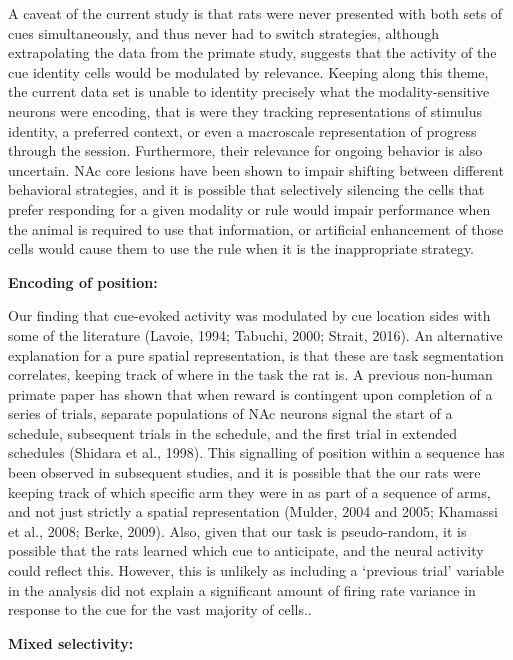 \documentclass[11pt]{article}
\begin{document}
{A caveat of the current study is that rats were never presented with both sets
of cues simultaneously, and thus never had to switch strategies, although
extrapolating the data from the primate study, suggests that the activity of the
cue identity cells would be modulated by relevance. Keeping along this theme,
the current data set is unable to identity precisely what the modality-sensitive
neurons were encoding, that is were they tracking representations of stimulus
identity, a preferred context, or even a macroscale representation of progress
through the session. Furthermore, their relevance for ongoing behavior is also
uncertain. NAc core lesions have been shown to impair shifting between different
behavioral strategies, and it is possible that selectively silencing the cells
that prefer responding for a given modality or rule would impair performance
when the animal is required to use that information, or artificial enhancement
of those cells would cause them to use the rule when it is the inappropriate
strategy.

{\bf Encoding of position:}

Our finding that cue-evoked activity was modulated by cue location sides with
some of the literature (Lavoie, 1994; Tabuchi, 2000; Strait, 2016). An
alternative explanation for a pure spatial representation, is that these are
task segmentation correlates, keeping track of where in the task the rat is. A
previous non-human primate paper has shown that when reward is contingent upon
completion of a series of trials, separate populations of NAc neurons signal the
start of a schedule, subsequent trials in the schedule, and the first trial in
extended schedules (Shidara et al., 1998). This signalling of position within a
sequence has been observed in subsequent studies, and it is possible that the
our rats were keeping track of which specific arm they were in as part of a
sequence of arms, and not just strictly a spatial representation (Mulder, 2004
and 2005; Khamassi et al., 2008; Berke, 2009). Also, given that our task is
pseudo-random, it is possible that the rats learned which cue to anticipate, and
the neural activity could reflect this. However, this is unlikely as including a
‘previous trial’ variable in the analysis did not explain a significant amount
of firing rate variance in response to the cue for the vast majority of cells..

{\bf Mixed selectivity:}

}
\end{document}
